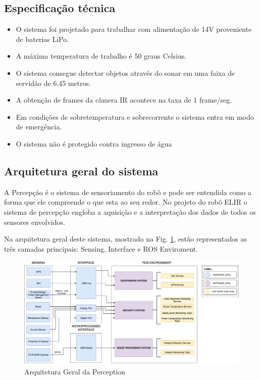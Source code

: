 \subsection{Especificação técnica}
\label{ssec:espt}

\begin{itemize}
\item O sistema foi projetado para trabalhar com alimentação de 14V proveniente de baterias LiPo.
\item A máxima temperatura de trabalho é 50 graus Celsius.
\item O sistema consegue detectar objetos através do sonar em uma faixa de servidão de 6.45 metros.
\item A obtenção de frames da câmera IR acontece na taxa de 1 frame/seg.
\item Em condições de sobretemperatura e sobrecorrente o sistema entra em modo de emergência.
\item O sistema não é protegido contra ingresso de água
\end{itemize} 




\subsection{Arquitetura geral do sistema}
\label{ssec:arqg}
A Percepção é o sistema de sensoriamento do robô e pode ser entendida como a forma que ele compreende o que esta ao seu redor. No projeto do robô ELIR o sistema de percepção engloba a aquisição e a interpretação dos dados de todos os sensores envolvidos.

Na arquitetura geral deste sistema, mostrado na Fig. \ref{arqgeral}, estão representados as três camadas principais: Sensing, Interface e ROS Enviroment.

\begin{figure}[!ht]
\centering
\includegraphics[width=15cm]{Figures/ArquiteturaPerceptionv2.png}
\caption{Arquitetura Geral da Perception}\label{arqgeral}
\end{figure}

